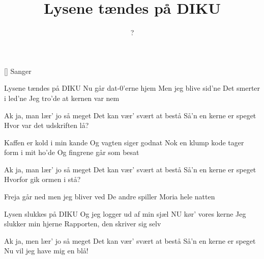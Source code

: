 \documentclass[a4paper,11pt]{article}
\title{Lysene tændes på DIKU}
\author{?}
\begin{document}
\maketitle

\begin{roles}
[] Sanger
\end{roles}


\begin{song}
%
Lysene tændes på DIKU
Nu går dat-0'erne hjem
Men jeg blive sid'ne
Det smerter i led'ne
Jeg tro'de at kernen var nem

Ak ja, man lær' jo så meget
Det kan vær' svært at bestå
Så'n en kerne er speget
Hvor var det udskriften lå?

Kaffen er kold i min kande
Og vagten siger godnat
Nok en klump kode
tager form i mit ho'de
Og fingrene går som besat

Ak ja, man lær' jo så meget
Det kan vær' svært at bestå
Så'n en kerne er speget
Hvorfor gik ormen i stå?

Freja går ned
men jeg bliver ved
De andre spiller Moria hele natten

Lysen slukkes på DIKU
Og jeg logger ud af min sjæl
NU kør' vores kerne
Jeg slukker min hjerne
Rapporten, den skriver sig selv

Ak ja, men lær' jo så meget
Det kan vær' svært at bestå
Så'n en kerne er speget
Nu vil jeg have mig en blå!
\end{song}
\end{document}
